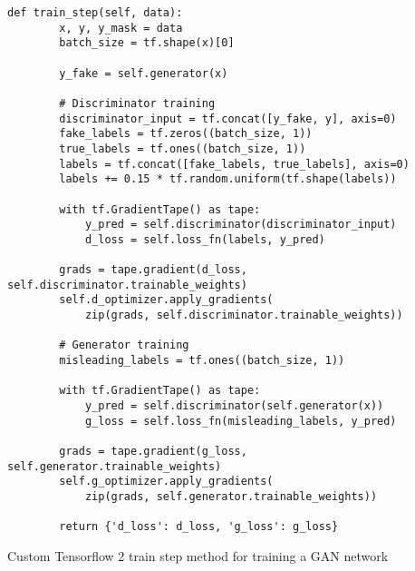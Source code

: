 \begin{listing}
\begin{verbatim}
def train_step(self, data):
        x, y, y_mask = data
        batch_size = tf.shape(x)[0]

        y_fake = self.generator(x)

        # Discriminator training
        discriminator_input = tf.concat([y_fake, y], axis=0)
        fake_labels = tf.zeros((batch_size, 1))
        true_labels = tf.ones((batch_size, 1))
        labels = tf.concat([fake_labels, true_labels], axis=0)
        labels += 0.15 * tf.random.uniform(tf.shape(labels))

        with tf.GradientTape() as tape:
            y_pred = self.discriminator(discriminator_input)
            d_loss = self.loss_fn(labels, y_pred)

        grads = tape.gradient(d_loss, self.discriminator.trainable_weights)
        self.d_optimizer.apply_gradients(
            zip(grads, self.discriminator.trainable_weights))

        # Generator training
        misleading_labels = tf.ones((batch_size, 1))

        with tf.GradientTape() as tape:
            y_pred = self.discriminator(self.generator(x))
            g_loss = self.loss_fn(misleading_labels, y_pred)

        grads = tape.gradient(g_loss, self.generator.trainable_weights)
        self.g_optimizer.apply_gradients(
            zip(grads, self.generator.trainable_weights))

        return {'d_loss': d_loss, 'g_loss': g_loss}
\end{verbatim}
\caption{Custom Tensorflow 2 train step method for training a GAN network}
\label{lst:train_step_gan}
\end{listing}

